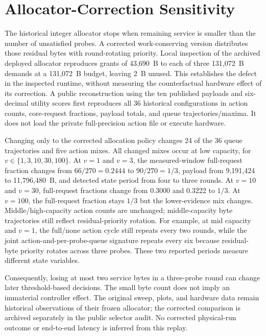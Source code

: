 \documentclass[10pt,onecolumn]{IEEEtran}
\begin{document}
\section{Allocator-Correction Sensitivity}
\label{sec:allocator_correction}
The historical integer allocator stops when remaining service is smaller
than the number of unsatisfied probes. A corrected work-conserving version
distributes those residual bytes with round-rotating priority. Local
inspection of the archived deployed allocator reproduces grants of
43,690~B to each of three 131,072~B demands at a 131,072~B budget, leaving
2~B unused. This establishes the defect in the inspected runtime, without
measuring the counterfactual hardware effect of its correction. A public
reconstruction using the ten published payloads and six-decimal utility
scores first reproduces all 36 historical configurations in action counts,
core-request fractions, payload totals, and queue trajectories/maxima. It
does not load the private full-precision action file or execute hardware.

Changing only to the corrected allocation policy changes 24 of the 36
queue trajectories and five action mixes. All changed mixes occur at low
capacity, for $v\in\{1,3,10,30,100\}$. At $v=1$ and $v=3$, the measured-window
full-request fraction changes from $66/270=0.2444$ to $90/270=1/3$, payload
from 9,191,424 to 11,796,480~B, and detected state period from four to three
rounds. At $v=10$ and $v=30$, full-request fractions change from 0.3000 and
0.3222 to $1/3$. At $v=100$, the full-request fraction stays $1/3$ but the
lower-evidence mix changes. Middle/high-capacity action counts are unchanged;
middle-capacity byte trajectories still reflect residual-priority rotation.
For example, at mid capacity and $v=1$, the full/none action cycle still
repeats every two rounds, while the joint action-and-per-probe-queue
signature repeats every six because residual-byte priority rotates across
three probes. These two reported periods measure different state variables.

Consequently, losing at most two service bytes in a three-probe round can
change later threshold-based decisions. The small byte count does not imply
an immaterial controller effect. The original sweep, plots, and hardware
data remain historical observations of their frozen allocator; the corrected
comparison is archived separately in the public selector audit. No corrected
physical-run outcome or end-to-end latency is inferred from this replay.
\end{document}
